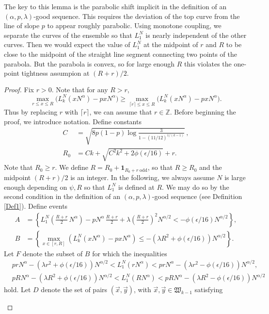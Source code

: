 	\begin{remark}
		The key to this lemma is the parabolic shift implicit in the definition of an $(\alpha,p,\lambda)$-good sequence. This requires the deviation of the top curve from the line of slope $p$ to appear roughly parabolic. Using monotone coupling, we separate the curves of the ensemble so that $L_1^N$ is nearly independent of the other curves. Then we would expect the value of $L_1^N$ at the midpoint of $r$ and $R$ to be close to the midpoint of the straight line segment connecting two points of the parabola. But the parabola is convex, so for large enough $R$ this violates the one-point tightness assumpion at $(R+r)/2$.
	\end{remark}
	
	\begin{proof}
		
		Fix $r>0$. Note that for any $R>r$,
		\[
		\max_{r\leq x\leq R} \big(L_k^N(xN^\alpha) - pxN^\alpha\big) \geq \max_{\lceil r\rceil \leq x \leq R} \big(L_k^N(xN^\alpha) - pxN^\alpha\big).
		\]
		Thus by replacing $r$ with $\lceil r\rceil$, we can assume that $r\in\mathbb{Z}$. Before beginning the proof, we introduce notation. Define constants
		\begin{align}
		C &= \sqrt{ 8p(1-p) \log\frac{3}{1-(11/12)^{1/(k-1)}}}\,,\label{21Cdef}\\
		R_0 &= Ck+\sqrt{C^{2}k^{2}+2\phi(\epsilon/16)}+r. \label{21Rdef}
		\end{align}
		Note that $R_0\geq r$. We define $R = R_0 + \mathbf{1}_{R_0 + r\;\mathrm{odd}}$, so that $R\geq R_0$ and the midpoint $(R+r)/2$ is an integer. In the following, we always assume $N$ is large enough depending on $\psi,R$ so that $L_1^N$ is defined at $R$. We may do so by the second condition in the definition of an $(\alpha,p,\lambda)$-good sequence (see Definition \ref{Def1}). Define events
		\begin{align*}
		A &= \left\{L_1^N\left(\frac{R+r}{2}\,N^\alpha\right) - pN^\alpha\,\frac{R+r}{2} + \lambda\left(\frac{R+r}{2}\right)^2 N^{\alpha/2} < -\phi(\epsilon/16)N^{\alpha/2}\right\},\\
		B &= \left\{\max_{x\in[r,R]} \left(L_k^N(xN^\alpha) - pxN^\alpha\right) \leq -(\lambda R^2 + \phi(\epsilon/16)) N^{\alpha/2} \right\}.
		\end{align*}
		Let $F$ denote the subset of $B$ for which the inequalities
		\begin{equation}\label{21x1y1}
		\begin{split}
		& prN^\alpha - (\lambda r^2+\phi(\epsilon/16))N^{\alpha/2} < L_1^N(rN^\alpha) <  prN^\alpha - (\lambda r^2-\phi(\epsilon/16))N^{\alpha/2},\\
		& pRN^\alpha - (\lambda R^2+\phi(\epsilon/16))N^{\alpha/2} < L_1^N(RN^\alpha) <  pRN^\alpha - (\lambda R^2-\phi(\epsilon/16))N^{\alpha/2}
		\end{split}
		\end{equation}
		hold. Let $D$ denote the set of pairs $(\vec{x},\vec{y})$, with $\vec{x},\vec{y}\in\mathfrak{W}_{k-1}$ satisfying 
		\begin{enumerate}[label=(\arabic*)]
			

\end{enumerate}
\end{proof}
